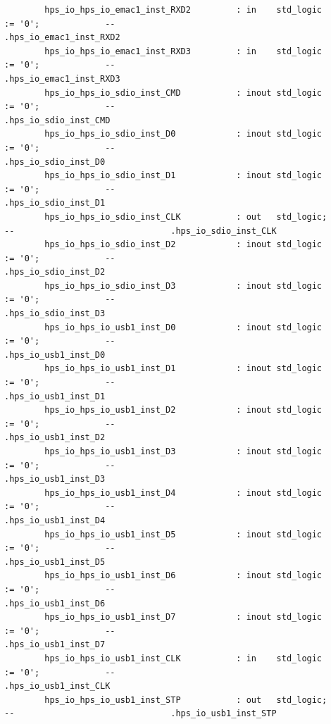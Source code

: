 \documentclass[conference]{IEEEtran}
\begin{document}
\begin{lstlisting}
		hps_io_hps_io_emac1_inst_RXD2         : in    std_logic                     := '0';             --                               .hps_io_emac1_inst_RXD2
		hps_io_hps_io_emac1_inst_RXD3         : in    std_logic                     := '0';             --                               .hps_io_emac1_inst_RXD3
		hps_io_hps_io_sdio_inst_CMD           : inout std_logic                     := '0';             --                               .hps_io_sdio_inst_CMD
		hps_io_hps_io_sdio_inst_D0            : inout std_logic                     := '0';             --                               .hps_io_sdio_inst_D0
		hps_io_hps_io_sdio_inst_D1            : inout std_logic                     := '0';             --                               .hps_io_sdio_inst_D1
		hps_io_hps_io_sdio_inst_CLK           : out   std_logic;                                        --                               .hps_io_sdio_inst_CLK
		hps_io_hps_io_sdio_inst_D2            : inout std_logic                     := '0';             --                               .hps_io_sdio_inst_D2
		hps_io_hps_io_sdio_inst_D3            : inout std_logic                     := '0';             --                               .hps_io_sdio_inst_D3
		hps_io_hps_io_usb1_inst_D0            : inout std_logic                     := '0';             --                               .hps_io_usb1_inst_D0
		hps_io_hps_io_usb1_inst_D1            : inout std_logic                     := '0';             --                               .hps_io_usb1_inst_D1
		hps_io_hps_io_usb1_inst_D2            : inout std_logic                     := '0';             --                               .hps_io_usb1_inst_D2
		hps_io_hps_io_usb1_inst_D3            : inout std_logic                     := '0';             --                               .hps_io_usb1_inst_D3
		hps_io_hps_io_usb1_inst_D4            : inout std_logic                     := '0';             --                               .hps_io_usb1_inst_D4
		hps_io_hps_io_usb1_inst_D5            : inout std_logic                     := '0';             --                               .hps_io_usb1_inst_D5
		hps_io_hps_io_usb1_inst_D6            : inout std_logic                     := '0';             --                               .hps_io_usb1_inst_D6
		hps_io_hps_io_usb1_inst_D7            : inout std_logic                     := '0';             --                               .hps_io_usb1_inst_D7
		hps_io_hps_io_usb1_inst_CLK           : in    std_logic                     := '0';             --                               .hps_io_usb1_inst_CLK
		hps_io_hps_io_usb1_inst_STP           : out   std_logic;                                        --                               .hps_io_usb1_inst_STP

\end{lstlisting}
\end{document}
